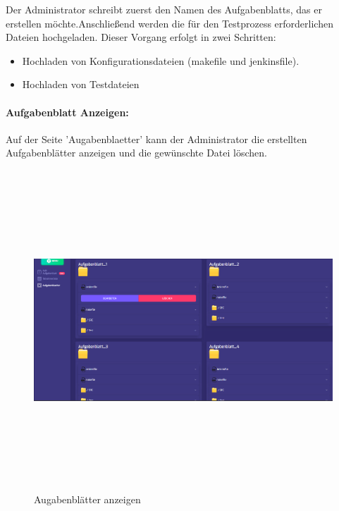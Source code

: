 \documentclass[a4paper,12pt,oneside]{book}
\begin{document}
\newline
Der Administrator schreibt zuerst den Namen des Aufgabenblatts, das er erstellen möchte.Anschließend werden die für den Testprozess erforderlichen Dateien hochgeladen. Dieser Vorgang erfolgt in zwei Schritten:
\begin{itemize}
	\item Hochladen von Konfigurationsdateien (makefile und jenkinsfile).
	\item Hochladen von Testdateien 
\end{itemize}
\newpage
\paragraph{Aufgabenblatt Anzeigen: } Auf der Seite 'Augabenblaetter' kann der Administrator die erstellten Aufgabenblätter anzeigen und die gewünschte Datei löschen.
\begin{figure}[h!]
	\begin{center}
		\includegraphics[width=15cm, height=12cm]{aufgabenblaetter.PNG}
		\caption{Augabenblätter anzeigen} 
		\label{Augabenblätter anzeigen} 
	\end{center}
\end{figure}
\newpage
\end{document}

